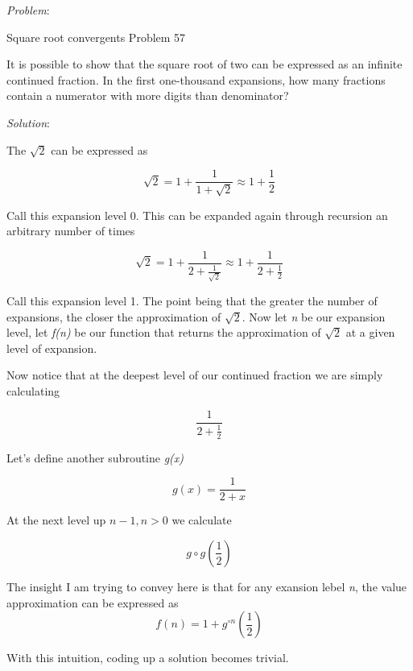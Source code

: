 \documentclass{article}
\begin{document}
\begin{flushleft}
\emph{Problem}:

Square root convergents
Problem 57

It is possible to show that the square root of two can be expressed as an infinite continued fraction.
In the first one-thousand expansions, how many fractions contain a numerator with more digits than denominator?


\emph{Solution}:

The $\sqrt{2}$ can be expressed as 

\[ \sqrt{2} = 1 + \frac{1}{1 + \sqrt{2}} \approx  1 + \frac{1}{2} \] 

Call this expansion level 0.
This can be expanded again through recursion an arbitrary number of times

\[ \sqrt{2} = 1 + \frac{1}{2 + \frac{1}{\sqrt{2}}} \approx  1 + \frac{1}{2 + \frac{1}{2}} \]

Call this expansion level 1.
The point being that the greater the number of expansions, the closer the approximation of $\sqrt{2}$. 
Now let \emph{n} be our expansion level, let \emph{f(n)} be our function that returns the approximation
of $\sqrt{2}$ at a given level of expansion.

Now notice that at the deepest level of our continued fraction we are simply calculating 

\[\frac{1}{2+\frac{1}{2}}\]

Let's define another subroutine \emph{g(x)} 

\[g(x)=\frac{1}{2+x}\]

At the next level up $n-1,n>0$ we calculate

\[g \circ g(\frac{1}{2})\]

The insight I am trying to convey here is that for any exansion lebel \emph{n}, the value approximation can be expressed as
\[ f(n) = 1 + g^{\circ n}(\frac{1}{2}) \]


With this intuition, coding up a solution becomes trivial.

\end{flushleft}
\end{document}

